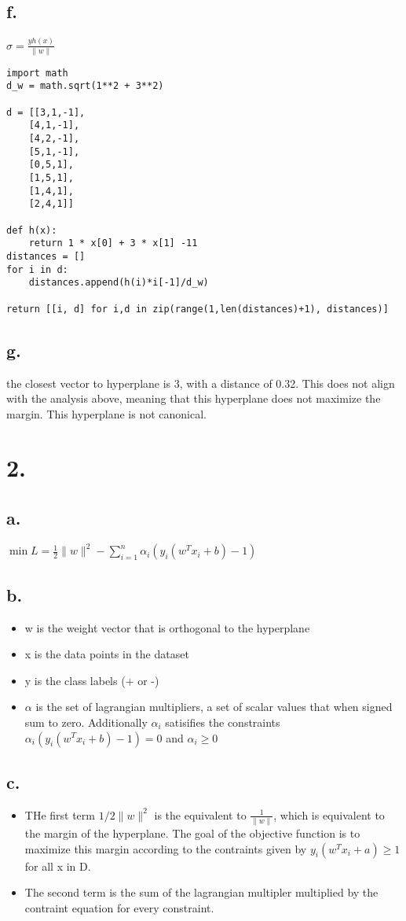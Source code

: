 \documentclass[11pt]{article}
\begin{document}
\subsection*{f.}
\label{sec:orgb80ca74}
\(\sigma = \frac{yh(x)}{\|w\|}\)
\begin{verbatim}
import math
d_w = math.sqrt(1**2 + 3**2)

d = [[3,1,-1],
    [4,1,-1],
    [4,2,-1],
    [5,1,-1],
    [0,5,1],
    [1,5,1],
    [1,4,1],
    [2,4,1]]

def h(x):
    return 1 * x[0] + 3 * x[1] -11
distances = []
for i in d:
    distances.append(h(i)*i[-1]/d_w)

return [[i, d] for i,d in zip(range(1,len(distances)+1), distances)]
\end{verbatim}
\subsection*{g.}
\label{sec:orge8aaa0c}
the closest vector to hyperplane is 3, with a distance of 0.32. This does not
align with the analysis above, meaning that this hyperplane does not maximize
the margin. This hyperplane is not canonical.
\section*{2.}
\label{sec:org9ed0033}
\subsection*{a.}
\label{sec:orgd79afe7}
\(\min L = \frac{1}{2}\|w\|^2 - \displaystyle \sum \limits^n_{i=1}\alpha_i(y_i(w^Tx_i + b)-1)\)
\subsection*{b.}
\label{sec:org81dc9db}
\begin{itemize}
\item w is the weight vector that is orthogonal to the hyperplane
\item x is the data points in the dataset
\item y is the class labels (+ or -)
\item \(\alpha\) is the set of lagrangian multipliers, a set of scalar values that when signed
sum to zero. Additionally \(\alpha_i\) satisifies the constraints
\(\alpha_i(y_i(w^Tx_i + b)-1) = 0\) and \(\alpha_i \ge 0\)
\end{itemize}
\subsection*{c.}
\label{sec:org2e4ee5b}
\begin{itemize}
\item THe first term \(1/2\|w\|^2\) is the equivalent to \(\frac{1}{\|w\|}\), which is
equivalent to the margin of the hyperplane. The goal of the objective function
is to maximize this margin according to the contraints given by
\(y_i(w^Tx_i + a) \ge 1\) for all x in D.
\item The second term is the sum of the lagrangian multipler multiplied by the
contraint equation for every constraint.
\end{itemize}
\end{document}
